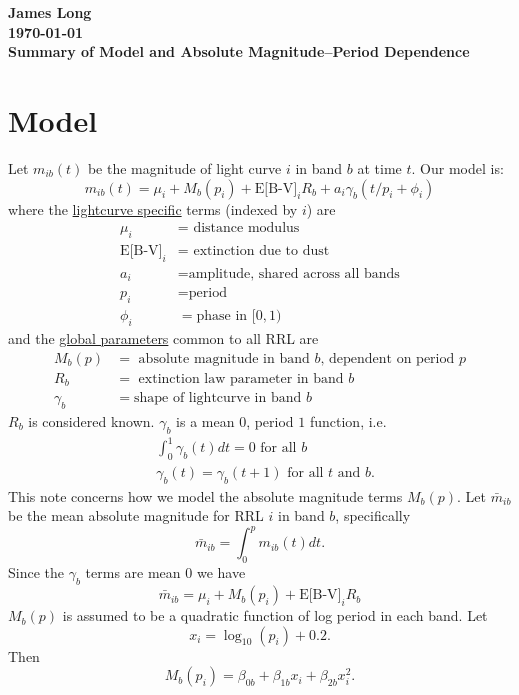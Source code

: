 \documentclass[12pt]{article}
\title{}
\date{}
\author{}
\begin{document}
\noindent
\textbf{James Long}\\
\textbf{\today}\\
\textbf{Summary of Model and Absolute Magnitude--Period Dependence}


\section{Model}

Let $m_{ib}(t)$ be the magnitude of light curve $i$ in band $b$ at time $t$. Our model is:
\begin{equation*}
m_{ib}(t) = \mu_i + M_{b}(p_i) + \text{E[B-V]}_iR_b + a_i\gamma_b(t/p_i + \phi_i)
\end{equation*}
where the \underline{lightcurve specific} terms (indexed by $i$) are 
\begin{align*}
  \mu_i &= \text{ distance modulus }\\
  \text{E[B-V]}_i &= \text{ extinction due to dust }\\
  a_i &= \text{amplitude, shared across all bands}\\
  p_i &= \text{period}\\
  \phi_i &= \text{phase in } [0,1)
\end{align*}
and the \underline{global parameters} common to all RRL are
\begin{align*}
  M_{b}(p) &= \text{ absolute magnitude in band $b$, dependent on period } p\\
  R_b &= \text{ extinction law parameter in band $b$}\\
  \gamma_b &= \text{shape of lightcurve in band $b$}
\end{align*}
$R_b$ is considered known. $\gamma_b$ is a mean $0$, period $1$ function, i.e.
\begin{align*}
  &\int_0^1 \gamma_b(t) dt = 0 \text{ for all } b\\
  &\gamma_b(t) = \gamma_b(t + 1) \text{ for all } t \text{ and } b.
\end{align*}
This note concerns how we model the absolute magnitude terms $M_b(p)$. Let $\bar{m}_{ib}$ be the mean absolute magnitude for RRL $i$ in band $b$, specifically
\begin{equation*}
  \bar{m}_{ib} = \int_0^p m_{ib}(t) dt.
\end{equation*}
Since the $\gamma_b$ terms are mean $0$ we have
\begin{equation*}
\bar{m}_{ib} = \mu_i + M_{b}(p_i) + \text{E[B-V]}_iR_b
\end{equation*}
$M_{b}(p)$ is assumed to be a quadratic function of log period in each band. Let
\begin{equation*}
  x_i = \log_{10}(p_i) + 0.2.
\end{equation*}
Then
\begin{equation*}
  M_{b}(p_i) = \beta_{0b} + \beta_{1b}x_i  + \beta_{2b}x_i^2.
\end{equation*}
\end{document}
